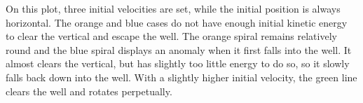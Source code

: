 \documentclass{article}
\begin{document}
\begin{center}
%
\label{labelname}%
\end{center}

\centering On this plot, three initial velocities are set, while the initial position is always horizontal. The orange and blue cases do not have enough initial kinetic energy to clear the vertical and escape the well. The orange spiral remains relatively round and the blue spiral displays an anomaly when it first falls into the well. It almost clears the vertical, but has slightly too little energy to do so, so it slowly falls back down into the well. With a slightly higher initial velocity, the green line clears the well and rotates perpetually. 

\begin{center}
%
\label{labelname}%
\end{center}
\end{document}
